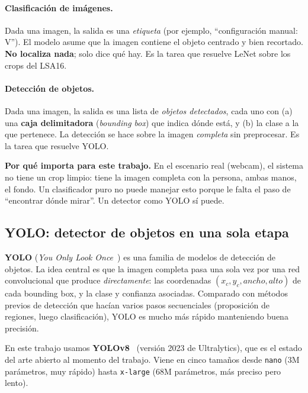\documentclass[a4paper,11pt]{article}
\begin{document}
\paragraph{Clasificación de imágenes.} Dada una imagen, la salida es una \emph{etiqueta} (por ejemplo, ``configuración manual: V''). El modelo asume que la imagen contiene el objeto centrado y bien recortado. \textbf{No localiza nada}; solo dice qué hay. Es la tarea que resuelve LeNet sobre los crops del LSA16.

\paragraph{Detección de objetos.} Dada una imagen, la salida es una lista de \emph{objetos detectados}, cada uno con (a) una \textbf{caja delimitadora} (\textit{bounding box}) que indica dónde está, y (b) la clase a la que pertenece. La detección se hace sobre la imagen \emph{completa} sin preprocesar. Es la tarea que resuelve YOLO.

\begin{concepto}
\textbf{Por qué importa para este trabajo.} En el escenario real (webcam), el sistema no tiene un crop limpio: tiene la imagen completa con la persona, ambas manos, el fondo. Un clasificador puro no puede manejar esto porque le falta el paso de ``encontrar dónde mirar''. Un detector como YOLO sí puede.
\end{concepto}

\subsection{YOLO: detector de objetos en una sola etapa}

\textbf{YOLO} (\textit{You Only Look Once}~\cite{redmon2016yolo}) es una familia de modelos de detección de objetos. La idea central es que la imagen completa pasa una sola vez por una red convolucional que produce \emph{directamente}: las coordenadas $(x_c, y_c, ancho, alto)$ de cada bounding box, y la clase y confianza asociadas. Comparado con métodos previos de detección que hacían varios pasos secuenciales (proposición de regiones, luego clasificación), YOLO es mucho más rápido manteniendo buena precisión.

En este trabajo usamos \textbf{YOLOv8}~\cite{jocher2023ultralytics} (versión 2023 de Ultralytics), que es el estado del arte abierto al momento del trabajo. Viene en cinco tamaños desde \texttt{nano} (3M parámetros, muy rápido) hasta \texttt{x-large} (68M parámetros, más preciso pero lento).
\end{document}
